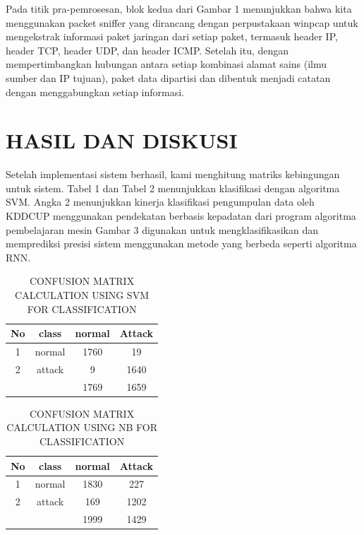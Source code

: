 \documentclass[conference]{IEEEtran}
\begin{document}
{Pada titik pra-pemrosesan, blok kedua dari Gambar 1 menunjukkan bahwa kita menggunakan packet sniffer yang dirancang dengan perpustakaan winpcap untuk mengekstrak informasi paket jaringan dari setiap paket, termasuk header IP, header TCP, header UDP, dan header ICMP. Setelah itu, dengan mempertimbangkan hubungan antara setiap kombinasi alamat sains (ilmu sumber dan IP tujuan), paket data dipartisi dan dibentuk menjadi catatan dengan menggabungkan setiap informasi.

\section{HASIL DAN DISKUSI}

Setelah implementasi sistem berhasil, kami menghitung matriks kebingungan untuk sistem. Tabel 1 dan Tabel 2 menunjukkan klasifikasi dengan algoritma SVM. Angka
2 menunjukkan kinerja klasifikasi pengumpulan data oleh KDDCUP menggunakan pendekatan berbasis kepadatan dari program algoritma pembelajaran mesin Gambar 3 digunakan untuk mengklasifikasikan dan memprediksi presisi sistem menggunakan
metode yang berbeda seperti algoritma RNN.

\begin{table}[hptb]
    \centering
    \caption{CONFUSION MATRIX CALCULATION USING SVM FOR CLASSIFICATION}
\begin{tabular}{|c|c|c|c|}
\hline
No & class & normal & Attack\\
\hline
1   & normal & 1760 & 19\\
\hline
2   & attack & 9 & 1640\\
\hline
\multicolumn{1}{c}{}  &  & 1769 & 1659 \\
\cline{3-4}
\end{tabular}
\end{table}


\begin{table}[hptb]
    \centering
    \caption{CONFUSION MATRIX CALCULATION USING NB FOR CLASSIFICATION}
    \begin{tabular}{|c|c|c|c|}
    \hline
    No & class & normal & Attack\\
    \hline
    1   & normal & 1830 & 227\\
    \hline
    2   & attack & 169 & 1202\\
    \hline
    \multicolumn{1}{c}{} &  & 1999 & 1429 \\
    \cline{3-4}
    \end{tabular}
\end{table}

}
\end{document}
